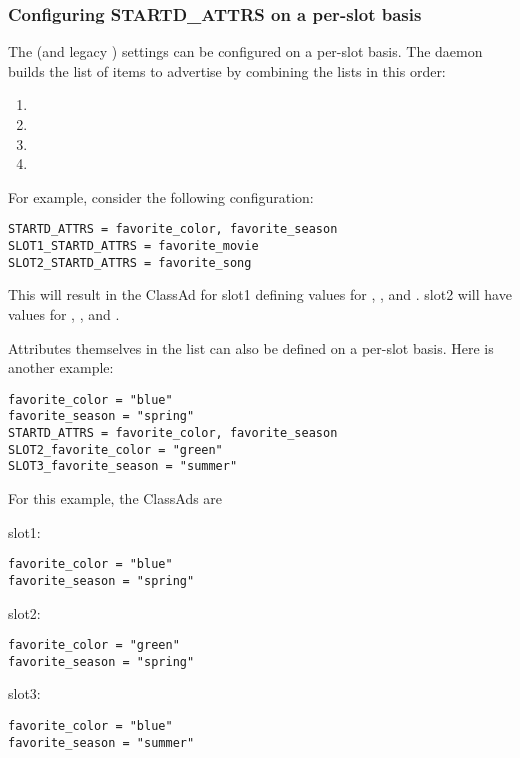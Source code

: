 \subsubsection{\label{sec:SMP-exprs}
Configuring STARTD\_ATTRS on a per-slot basis}

The  (and legacy ) settings
can be configured on a per-slot basis.
The  daemon builds the list of items to
advertise by combining the lists in this order:
\begin{enumerate}
\item{}
\item{}
\item{}
\item{}
\end{enumerate}

For example, consider the following configuration:
\begin{verbatim}
STARTD_ATTRS = favorite_color, favorite_season
SLOT1_STARTD_ATTRS = favorite_movie
SLOT2_STARTD_ATTRS = favorite_song
\end{verbatim}

This will result in the  ClassAd for
slot1 defining values for
, ,
and .
slot2 will have values for
, , and .

Attributes themselves in the  list
can also be defined on a per-slot basis.
Here is another example:

\begin{verbatim}
favorite_color = "blue"
favorite_season = "spring"
STARTD_ATTRS = favorite_color, favorite_season
SLOT2_favorite_color = "green"
SLOT3_favorite_season = "summer"
\end{verbatim}

For this example, the  ClassAds are
\begin{description}
\item{slot1}:
\begin{verbatim}
favorite_color = "blue"
favorite_season = "spring"
\end{verbatim}
\item{slot2}:
\begin{verbatim}
favorite_color = "green"
favorite_season = "spring"
\end{verbatim}
\item{slot3}:
\begin{verbatim}
favorite_color = "blue"
favorite_season = "summer"
\end{verbatim}
\end{description}

